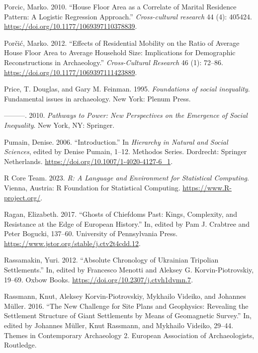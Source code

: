 \documentclass[
  12pt,
  a4paper, twoside]{book}
\newlength{\cslhangindent}
\newlength{\cslentryspacingunit} %
\newenvironment{CSLReferences}[2] %
 {%
  \setlength{\parindent}{0pt}
  \ifodd #1
  \let\oldpar\par
  \def\par{\hangindent=\cslhangindent\oldpar}
  \fi
  \setlength{\parskip}{#2\cslentryspacingunit}
 }%
 {}
\begin{document}
\begin{CSLReferences}{1}{0}
\leavevmode{}%
Porcic, Marko. 2010. {``House Floor Area as a Correlate of Marital Residence Pattern: A Logistic Regression Approach.''} \emph{Cross-cultural research} 44 (4): 405424. \url{https://doi.org/10.1177/1069397110378839}.

\leavevmode{}%
Porčić, Marko. 2012. {``Effects of Residential Mobility on the Ratio of Average House Floor Area to Average Household Size: Implications for Demographic Reconstructions in Archaeology.''} \emph{Cross-Cultural Research} 46 (1): 72--86. \url{https://doi.org/10.1177/1069397111423889}.

\leavevmode{}%
Price, T. Douglas, and Gary M. Feinman. 1995. \emph{Foundations of social inequality}. Fundamental issues in archaeology. New York: Plenum Press.

\leavevmode{}%
---------. 2010. \emph{Pathways to Power: New Perspectives on the Emergence of Social Inequality}. New York, NY: Springer.

\leavevmode{}%
Pumain, Denise. 2006. {``Introduction.''} In \emph{Hierarchy in {Natural} and {Social Sciences}}, edited by Denise Pumain, 1--12. Methodos {Series}. {Dordrecht}: {Springer Netherlands}. \url{https://doi.org/10.1007/1-4020-4127-6_1}.

\leavevmode{}%
R Core Team. 2023. \emph{R: A Language and Environment for Statistical Computing}. Vienna, Austria: R Foundation for Statistical Computing. \url{https://www.R-project.org/}.

\leavevmode{}%
Ragan, Elizabeth. 2017. {``Ghosts of Chiefdoms Past: Kings, Complexity, and Resistance at the Edge of European History.''} In, edited by Pam J. Crabtree and Peter Bogucki, 137--60. University of Pennsylvania Press. \url{https://www.jstor.org/stable/j.ctv2t4cdd.12}.

\leavevmode{}%
Rassamakin, Yuri. 2012. {``Absolute Chronology of Ukrainian Tripolian Settlements.''} In, edited by Francesco Menotti and Aleksey G. Korvin-Piotrovskiy, 19--69. Oxbow Books. \url{https://doi.org/10.2307/j.ctvh1dvmn.7}.

\leavevmode{}%
Rassmann, Knut, Aleksey Korvin-Piotrovskiy, Mykhailo Videiko, and Johannes Müller. 2016. {``The New Challenge for Site Plans and Geophysics: Revealing the Settlement Structure of Giant Settlements by Means of Geomagnetic Survey.''} In, edited by Johannes Müller, Knut Rassmann, and Mykhailo Videiko, 29--44. Themes in Contemporary Archaeology 2. European Association of Archaeologists, Routledge.


\end{CSLReferences}
\end{document}
